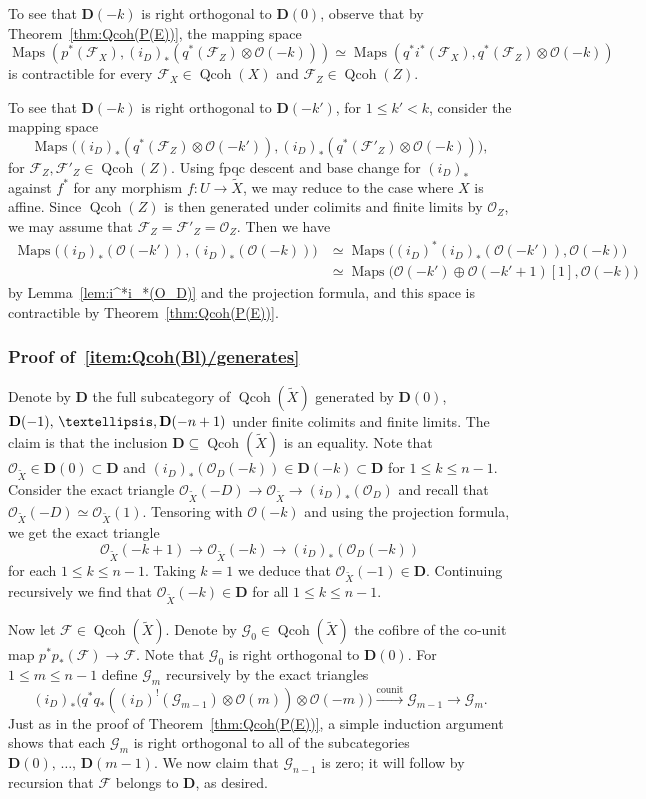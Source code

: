 \documentclass[11pt]{article}
\theoremstyle{definition}
\numberwithin{equation}{section}
\numberwithin{figure}{section}
\numberwithin{table}{section}
\newcommand{\sF}{\ensuremath{\mathcal{F}}\xspace}
\newcommand{\sG}{\ensuremath{\mathcal{G}}\xspace}
\newcommand{\sO}{\ensuremath{\mathcal{O}}\xspace}
\newcommand{\bD}{\ensuremath{\mathbf{D}}\xspace}
\renewcommand{\le}{\leqslant}
\DeclareMathOperator{\Maps}{Maps}
\DeclareMathOperator{\Qcoh}{Qcoh}
\newcommand{\mrm}[1]{\ensuremath{\mathrm{#1}}\xspace}
\begin{document}
To see that $\bD(-k)$ is right orthogonal to $\bD(0)$, observe that by Theorem~\ref{thm:Qcoh(P(E))}, the mapping space
\[
\Maps(p^*(\sF_X), (i_D)_*(q^*(\sF_Z) \otimes \sO(-k)))
\simeq \Maps(q^*i^*(\sF_X), q^*(\sF_Z) \otimes \sO(-k))
\]
is contractible for every $\sF_X \in \Qcoh(X)$ and $\sF_Z \in \Qcoh(Z)$.

To see that $\bD(-k)$ is right orthogonal to $\bD(-k')$, for $1\le k'< k$, consider the mapping space
\[
\Maps\big((i_D)_*(q^*(\sF_Z) \otimes \sO(-k')), (i_D)_*(q^*(\sF'_Z) \otimes \sO(-k))\big),
\]
for $\sF_Z,\sF'_Z \in \Qcoh(Z)$. Using fpqc descent and base change for $(i_D)_*$ against $f^*$ for any morphism $f : U \to \widetilde{X}$, we may reduce to the case where $X$ is affine. Since $\Qcoh(Z)$ is then generated under colimits and finite limits by $\sO_Z$, we may assume that $\sF_Z = \sF'_Z = \sO_Z$. Then we have
\begin{align*}
\Maps\big((i_D)_*(\sO(-k')), (i_D)_*(\sO(-k))\big) &\simeq \Maps\big((i_D)^*(i_D)_*(\sO(-k')), \sO(-k)\big)\\
&\simeq \Maps\big(\sO(-k') \oplus \sO(-k'+1)[1], \sO(-k)\big)
\end{align*}
by Lemma~\ref{lem:i^*i_*(O_D)} and the projection formula, and this space is contractible by Theorem~\ref{thm:Qcoh(P(E))}.

\subsubsection{Proof of~\eqref{item:Qcoh(Bl)/generates}}

Denote by $\bD$ the full subcategory of $\Qcoh(\widetilde{X})$ generated by $\bD(0)$, $\bD(-1),\,\ldots,\linebreak\bD(-n+1)$ under finite colimits and finite limits. The claim is that the inclusion $\bD \subseteq \Qcoh(\widetilde{X})$ is an equality. Note that $\sO_{\widetilde{X}} \in \bD(0) \subset \bD$ and $(i_D)_*(\sO_D(-k)) \in \bD(-k) \subset \bD$ for $1\le k\le n-1$. Consider the exact triangle $\sO_{\widetilde{X}}(-D) \to \sO_{\widetilde{X}} \to (i_D)_*(\sO_D)$ and recall that $\sO_{\widetilde{X}}(-D) \simeq \sO_{\widetilde{X}}(1)$. Tensoring with $\sO(-k)$ and using the projection formula, we get the exact triangle
\[
\sO_{\widetilde{X}}(-k+1) \to \sO_{\widetilde{X}}(-k) \to (i_D)_*(\sO_D(-k))
\]
for each $1\le k\le n-1$. Taking $k=1$ we deduce that $\sO_{\widetilde{X}}(-1) \in \bD$. Continuing recursively we find that $\sO_{\widetilde{X}}(-k) \in \bD$ for all $1\le k\le n-1$.

Now let $\sF \in \Qcoh(\widetilde{X})$. Denote by $\sG_0 \in \Qcoh(\widetilde{X})$ the cofibre of the co-unit map $p^*p_*(\sF) \to \sF$. Note that $\sG_0$ is right orthogonal to $\bD(0)$. For $1\le m\le n-1$ define $\sG_m$ recursively by the exact triangles
\[
(i_D)_*\big(q^*q_*((i_D)^!(\sG_{m-1}) \otimes \sO(m)) \otimes \sO(-m)\big)
\xrightarrow{\mrm{counit}} \sG_{m-1} \to \sG_m.
\]
Just as in the proof of Theorem~\ref{thm:Qcoh(P(E))}, a simple induction argument shows that each $\sG_m$ is right orthogonal to all of the subcategories $\bD(0),\,\ldots,\,\bD(m-1)$. We now claim that $\sG_{n-1}$ is zero; it will follow by recursion that $\sF$ belongs to $\bD$, as desired.
\end{document}
